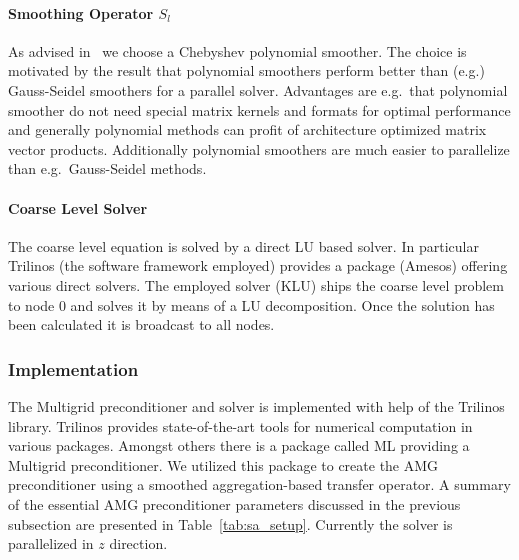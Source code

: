 \paragraph{Smoothing Operator $S_l$} As advised in~\cite{abht:03} we
choose a Chebyshev polynomial smoother.  The choice is motivated by the
result that polynomial smoothers perform better than (e.g.) Gauss-Seidel
smoothers for a parallel solver.  Advantages are e.g.\ that polynomial
smoother do not need special matrix kernels and formats for optimal
performance and generally polynomial methods can profit of architecture
optimized matrix vector products.  Additionally polynomial smoothers are
much easier to parallelize than e.g.\ Gauss-Seidel methods.

\paragraph{Coarse Level Solver} The coarse level equation is solved by a
direct LU based solver.  In particular Trilinos (the software framework
employed) provides a package (Amesos) offering various direct
solvers.  The employed solver (KLU) ships the coarse level problem to
node $0$ and solves it by means of a LU decomposition.  Once the solution
has been calculated it is broadcast to all nodes.

\subsubsection*{Implementation}

The Multigrid preconditioner and solver is implemented with help of the
Trilinos \cite{Trilinos-TOMS} library.  Trilinos provides
state-of-the-art tools for numerical computation in various
packages.  Amongst others there is a package called ML \cite{gsht:06}
providing a Multigrid preconditioner.  We utilized this package to create
the AMG preconditioner using a smoothed aggregation-based transfer
operator.   A summary of the essential AMG preconditioner parameters
discussed in the previous subsection are presented in
Table~\ref{tab:sa_setup}.  Currently the solver is parallelized in $z$
direction.

